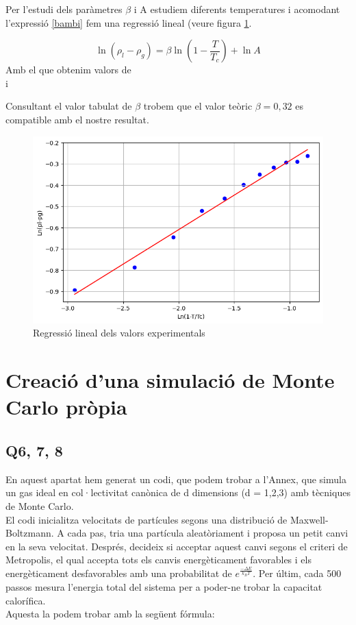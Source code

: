 \documentclass{article}
\begin{document}
	Per l'estudi dels paràmetres $\beta$ i A estudiem diferents temperatures i acomodant l'expressió \ref{bambi} fem una regressió lineal (veure figura \ref{1}.
	
	\begin{equation}
		\ln(\rho_l-\rho_g)=\beta \ln\left(1-\frac{T}{T_c}\right)+ \ln A
	\end{equation}
	Amb el que obtenim valors de
	\\
	 i 
	
	Consultant el valor tabulat de $\beta$ trobem que el valor teòric $\beta=0,32$ es compatible amb el nostre resultat.
	\begin{figure}[h!] 
		\centering
		\includegraphics[width=0.7\linewidth]{regresionq5.png}
		\caption{Regressió lineal dels valors experimentals}
		\label{1}
	\end{figure}
	
	
	
	\section{Creació d'una simulació de Monte Carlo pròpia}
	\subsection*{Q6, 7, 8}
	En aquest apartat hem generat un codi, que podem trobar a l'Annex, que simula un gas ideal en col·lectivitat canònica de d dimensions (d = 1,2,3) amb tècniques de Monte Carlo.
	\\
	El codi inicialitza velocitats de partícules segons una distribució de Maxwell-Boltzmann. A cada pas, tria una partícula aleatòriament i proposa un petit canvi en la seva velocitat. Després, decideix si acceptar aquest canvi segons el criteri de Metropolis, el qual accepta tots els canvis energèticament favorables i els energèticament desfavorables amb una probabilitat de $e^{\frac{-\Delta E}{k_BT}}$. Per últim, cada 500 passos mesura l'energia total del sistema per a poder-ne trobar la capacitat calorífica.
	\\
	Aquesta la podem trobar amb la següent fórmula:
	
\end{document}
